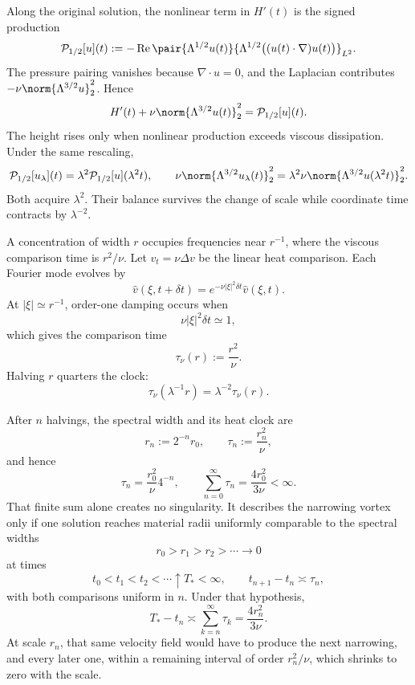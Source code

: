 Along the original solution, the nonlinear term in \(H'(t)\) is the signed production
\[
  \mathcal P_{1/2}[u](t)
  :=
  -\operatorname{Re}
  \pair
    {\Lambda^{1/2}u(t)}
    {\Lambda^{1/2}\bigl((u(t)\cdot\nabla)u(t)\bigr)}_{L^2}.
\]
The pressure pairing vanishes because \(\nabla\cdot u=0\), and the Laplacian contributes \(-\nu\norm{\Lambda^{3/2}u}_2^2\). Hence
\[
  H'(t)
  +
  \nu\norm{\Lambda^{3/2}u(t)}_2^2
  =
  \mathcal P_{1/2}[u](t).
\]
The height rises only when nonlinear production exceeds viscous dissipation. Under the same rescaling,
\[
  \mathcal P_{1/2}[u_\lambda](t)
  =
  \lambda^2\mathcal P_{1/2}[u](\lambda^2t),
  \qquad
  \nu\norm{\Lambda^{3/2}u_\lambda(t)}_2^2
  =
  \lambda^2\nu\norm{\Lambda^{3/2}u(\lambda^2t)}_2^2.
\]
Both acquire \(\lambda^2\). Their balance survives the change of scale while coordinate time contracts by \(\lambda^{-2}\).


A concentration of width \(r\) occupies frequencies near \(r^{-1}\), where the viscous comparison time is \(r^2/\nu\). Let \(v_t=\nu\Delta v\) be the linear heat comparison. Each Fourier mode evolves by
\[
  \widehat v(\xi,t+\delta t)
  =
  e^{-\nu|\xi|^2\delta t}\widehat v(\xi,t).
\]
At \(|\xi|\simeq r^{-1}\), order-one damping occurs when
\[
  \nu|\xi|^2\delta t\simeq1,
\]
which gives the comparison time
\[
  \tau_\nu(r)
  :=
  \frac{r^2}{\nu}.
\]
Halving \(r\) quarters the clock:
\[
  \tau_\nu(\lambda^{-1}r)
  =
  \lambda^{-2}\tau_\nu(r).
\]


After \(n\) halvings, the spectral width and its heat clock are
\[
  r_n:=2^{-n}r_0,
  \qquad
  \tau_n:=\frac{r_n^2}{\nu},
\]
and hence
\[
  \tau_n
  =
  \frac{r_0^2}{\nu}4^{-n},
  \qquad
  \sum_{n=0}^{\infty}\tau_n
  =
  \frac{4r_0^2}{3\nu}
  <
  \infty.
\]
That finite sum alone creates no singularity. It describes the narrowing vortex only if one \NavierStokes{} solution reaches material radii uniformly comparable to the spectral widths
\[
  r_0>r_1>r_2>\cdots\longrightarrow0
\]
at times
\[
  t_0<t_1<t_2<\cdots\uparrow T_*<\infty,
  \qquad
  t_{n+1}-t_n\asymp\tau_n,
\]
with both comparisons uniform in \(n\). Under that hypothesis,
\[
  T_*-t_n
  \asymp
  \sum_{k=n}^{\infty}\tau_k
  =
  \frac{4r_n^2}{3\nu}.
\]
At scale \(r_n\), that same velocity field would have to produce the next narrowing, and every later one, within a remaining interval of order \(r_n^2/\nu\), which shrinks to zero with the scale.
